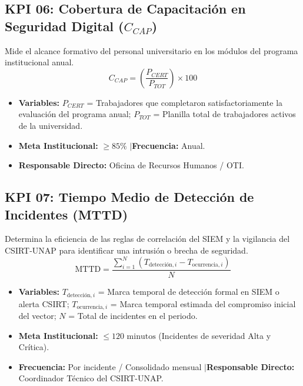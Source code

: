 \subsection{KPI 06: Cobertura de Capacitación en Seguridad Digital \texorpdfstring{($C_{CAP}$)}{(C\_CAP)}}
Mide el alcance formativo del personal universitario en los módulos del programa institucional anual.
\[
C_{CAP} = \left( \frac{P_{CERT}}{P_{TOT}} \right) \times 100
\]
\begin{itemize}[leftmargin=1.5em, itemsep=1pt]
    \item \textbf{Variables:} $P_{CERT}$ = Trabajadores que completaron satisfactoriamente la evaluación del programa anual; $P_{TOT}$ = Planilla total de trabajadores activos de la universidad.
    \item \textbf{Meta Institucional:} $\ge 85\%$ \quad$\vert$\quad \textbf{Frecuencia:} Anual.
    \item \textbf{Responsable Directo:} Oficina de Recursos Humanos / OTI.
\end{itemize}

\subsection{KPI 07: Tiempo Medio de Detección de Incidentes (MTTD)}
Determina la eficiencia de las reglas de correlación del SIEM y la vigilancia del CSIRT-UNAP para identificar una intrusión o brecha de seguridad.
\[
\text{MTTD} = \frac{\sum_{i=1}^{N} \left( T_{\text{detección}, i} - T_{\text{ocurrencia}, i} \right)}{N}
\]
\begin{itemize}[leftmargin=1.5em, itemsep=1pt]
    \item \textbf{Variables:} $T_{\text{detección}, i}$ = Marca temporal de detección formal en SIEM o alerta CSIRT; $T_{\text{ocurrencia}, i}$ = Marca temporal estimada del compromiso inicial del vector; $N$ = Total de incidentes en el periodo.
    \item \textbf{Meta Institucional:} $\le 120\text{ minutos}$ (Incidentes de severidad Alta y Crítica).
    \item \textbf{Frecuencia:} Por incidente / Consolidado mensual \quad$\vert$\quad \textbf{Responsable Directo:} Coordinador Técnico del CSIRT-UNAP.
\end{itemize}

